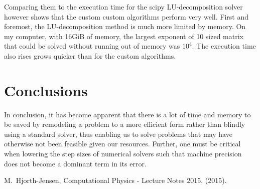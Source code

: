 \documentclass[10pt,showpacs,preprintnumbers,footinbib,amsmath,amssymb,aps,prl,twocolumn,groupedaddress,superscriptaddress,showkeys]{revtex4-1}
\begin{document}
  Comparing them to the execution time for the scipy LU-decomposition solver however shows that the custom custom algorithms perform very well. First and foremost, the LU-decomposition method is much more limited by memory. On my computer, with 16GiB of memory, the largest exponent of 10 sized matrix that could be solved without running out of memory was $10^4$. The execution time also rises grows quicker than for the custom algorithms.

\section{Conclusions}

  In conclusion, it has become apparent that there is a lot of time and memory to be saved by remodeling a problem to a more efficient form rather than blindly using a standard solver, thus enabling us to solve problems that may have otherwise not been feasible given our resources. Further, one must be critical when lowering the step sizes of numerical solvers such that machine precision does not become a dominant term in its error.


\begin{thebibliography}{99}
 M.~Hjorth-Jensen, Computational Physics - Lecture Notes 2015, (2015).
\end{thebibliography}
\end{document}
